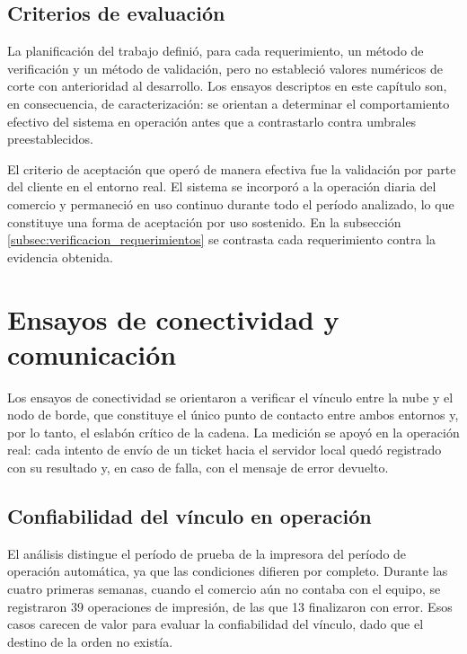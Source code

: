 \subsection{Criterios de evaluación}
\label{subsec:criterios}

La planificación del trabajo definió, para cada requerimiento, un método de verificación y un método de validación, pero no estableció valores numéricos de corte con anterioridad al desarrollo. Los ensayos descriptos en este capítulo son, en consecuencia, de caracterización: se orientan a determinar el comportamiento efectivo del sistema en operación antes que a contrastarlo contra umbrales preestablecidos.

El criterio de aceptación que operó de manera efectiva fue la validación por parte del cliente en el entorno real. El sistema se incorporó a la operación diaria del comercio y permaneció en uso continuo durante todo el período analizado, lo que constituye una forma de aceptación por uso sostenido. En la subsección \ref{subsec:verificacion_requerimientos} se contrasta cada requerimiento contra la evidencia obtenida.


\section{Ensayos de conectividad y comunicación}
\label{sec:ensayos_conectividad}

Los ensayos de conectividad se orientaron a verificar el vínculo entre la nube y el nodo de borde, que constituye el único punto de contacto entre ambos entornos y, por lo tanto, el eslabón crítico de la cadena. La medición se apoyó en la operación real: cada intento de envío de un ticket hacia el servidor local quedó registrado con su resultado y, en caso de falla, con el mensaje de error devuelto.

\subsection{Confiabilidad del vínculo en operación}
\label{subsec:confiabilidad_vinculo}

El análisis distingue el período de prueba de la impresora del período de operación automática, ya que las condiciones difieren por completo. Durante las cuatro primeras semanas, cuando el comercio aún no contaba con el equipo, se registraron 39 operaciones de impresión, de las que 13 finalizaron con error. Esos casos carecen de valor para evaluar la confiabilidad del vínculo, dado que el destino de la orden no existía.


